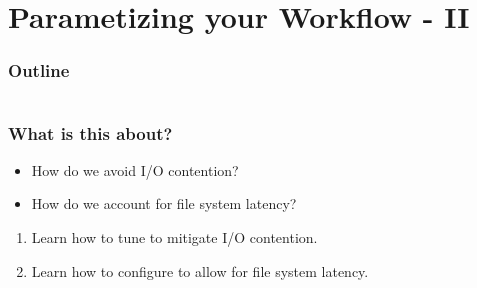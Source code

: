 \section{Parametizing your Workflow - II}

\begin{frame}
    \frametitle{Outline}
    \begin{columns}[t]
        \begin{column}{.5\textwidth}
            \tableofcontents[sections={1-9},currentsection]
        \end{column}
        \begin{column}{.5\textwidth}
            \tableofcontents[sections={10-18},currentsection]
        \end{column}
    \end{columns}
\end{frame}

\begin{frame}
  \frametitle{What is this about?}
  \begin{question}[Questions]
   	\begin{itemize}
      \item How do we avoid I/O contention?
      \item How do we account for file system latency?
    \end{itemize}
  \end{question}
   \begin{docs}[Objectives]
   	 \begin{enumerate} 
        \item Learn how to tune \Snakemake{} to mitigate I/O contention.
        \item Learn how to configure \Snakemake{} to allow for file system latency.
    \end{enumerate}
  \end{docs}
\end{frame}

